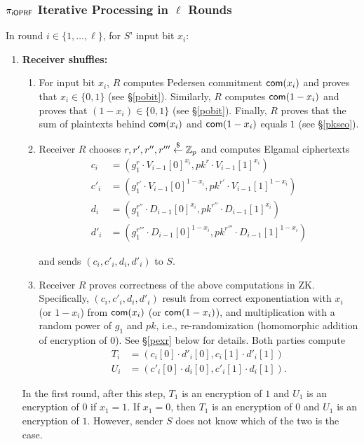 \subsubsection{${\pi_{\mathsf{i}\mathsf{OPRF}}}$ Iterative Processing in $\ell$ Rounds}
In round $i\in\{1,\ldots,\ell\}$, for $S$' input bit $x_i$:
\begin{enumerate}
  
\item {\bf Receiver shuffles:}
\begin{enumerate}%
\item For input bit $x_i$, $R$ computes Pedersen commitment
  $\mathsf{com}{}(x_i)$ and proves that $x_i\in\{0,1\}$ (see
  \S\ref{pobit}). Similarly, $R$ computes $\mathsf{com}{}(1-x_i)$
  and proves that $(1-x_i)\in\{0,1\}$ (see \S\ref{pobit}). Finally,
  $R$ proves that the sum of plaintexts behind
  $\mathsf{com}{}(x_i)$ and $\mathsf{com}{}(1-x_i)$ equals $1$ (see
  \S\ref{pkseo}).


\item  Receiver $R$ chooses $r,r',r'',r'''\stackrel{\$}{\leftarrow}\mathbb{Z}_p$ and computes Elgamal ciphertexts
  \begin{align*}
    c_i&=(g_1^r\cdot{}V_{i-1}[0]^{x_i},pk^{r}\cdot{}V_{i-1}[1]^{x_i})
    \\c'_i&=(g_1^{r'}\cdot{}V_{i-1}[0]^{1-x_i},pk^{r'}\cdot{}V_{i-1}[1]^{1-x_i})
    \\d_i&=(g_1^{r''}\cdot{}D_{i-1}[0]^{x_i},pk^{r''}\cdot{}D_{i-1}[1]^{x_i})
    \\d'_i&=(g_1^{r'''}\cdot{}D_{i-1}[0]^{1-x_i},pk^{r'''}\cdot{}D_{i-1}[1]^{1-x_i})
 \end{align*} 
  and sends $(c_i,c'_i,d_i,d'_i)$ to $S$.
\item Receiver $R$ proves correctness of the above computations in
  ZK. Specifically, $(c_i,c'_i,d_i,d'_i)$ result from correct
  exponentiation with $x_i$ (or $1-x_i$) from $\mathsf{com}{}(x_i)$ (or
  $\mathsf{com}{}(1-x_i)$), and multiplication with a random power of
  $g_1$ and $pk$, i.e., re-randomization (homomorphic addition of
  encryption of $0$).  See \S\ref{pexr} below for details.
   Both parties compute
\begin{align*}
   T_i&=(c_i[0]\cdot{}d'_i[0],c_i[1]\cdot{}d'_i[1])
    \\U_i&=(c'_i[0]\cdot{}d_i[0],c'_i[1]\cdot{}d_i[1]).
\end{align*}   
  \end{enumerate}
In the first round, after this step, $T_1$ is an encryption of $1$ and $U_1$ is an encryption of $0$ if $x_1 = 1$.
If $x_1 = 0$, then $T_1$ is an encryption of $0$ and $U_1$ is an encryption of $1$.
However,  sender $S$ does not know which of the two is the case.


\end{enumerate}
